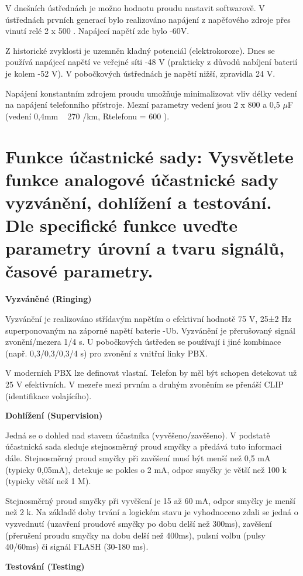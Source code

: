 V dnešních ústřednách je možno hodnotu proudu nastavit softwarově. V ústřednách prvních generací bylo realizováno napájení z napěťového zdroje přes vinutí relé 2 x 500 . Napájecí napětí zde bylo -60V.

Z historické zvyklosti je uzemněn kladný potenciál (elektrokoroze). Dnes se používá napájecí napětí ve veřejné síti -48 V (prakticky z důvodů nabíjení baterií je kolem -52 V). V pobočkových ústřednách je napětí nižší, zpravidla 24 V.

Napájení konstantním zdrojem proudu umožňuje minimalizovat vliv délky vedení na napájení telefonního přístroje. Mezní parametry vedení jsou 2 x 800 a 0,5 $\mu$F (vedení 0,4mm ~ 270 /km, Rtelefonu = 600 ).

\section{Funkce účastnické sady: Vysvětlete funkce analogové účastnické sady vyzvánění, dohlížení a testování. Dle specifické funkce uveďte parametry úrovní a tvaru signálů, časové parametry.}

\textbf{Vyzváněné (Ringing)}

Vyzvánění je realizováno střídavým napětím o efektivní hodnotě 75 V, 25±2 Hz superponovaným na záporné napětí baterie -Ub. Vyzvánění je přerušovaný signál zvonění/mezera 1/4 s. U pobočkových ústředen se používají i jiné kombinace (např. 0,3/0,3/0,3/4 s) pro zvonění z vnitřní linky PBX.

V moderních PBX lze definovat vlastní. Telefon by měl být schopen detekovat už 25 V efektivních. V mezeře mezi prvním a druhým zvoněním se přenáší CLIP (identifikace volajícího).

\noindent\textbf{Dohlížení (Supervision)}

Jedná se o dohled nad stavem účastníka (vyvěšeno/zavěšeno). V podstatě účastnická sada sleduje stejnosměrný proud smyčky a předává tuto informaci dále. Stejnosměrný proud smyčky při zavěšení musí být menší než 0,5 mA (typicky 0,05mA), detekuje se pokles o 2 mA, odpor smyčky je větší než 100 k (typicky větší než 1 M).

Stejnosměrný proud smyčky při vyvěšení je 15 až 60 mA, odpor smyčky je menší než 2 k. Na základě doby trvání a logickém stavu je vyhodnoceno zdali se jedná o vyzvednutí (uzavření proudové smyčky po dobu delší než 300ms), zavěšení (přerušení proudu smyčky na dobu delší než 400ms), pulsní volbu (pulsy 40/60ms) či signál FLASH (30-180 ms).

\noindent\textbf{Testování (Testing)}

